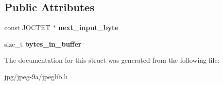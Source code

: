 \subsection*{Public Attributes}
\begin{DoxyCompactItemize}
\item 
\hypertarget{structjpeg__source__mgr_aad884e7f4ba7496ab0f56c942c7585c1}{const J\+O\+C\+T\+E\+T $\ast$ {\bfseries next\+\_\+input\+\_\+byte}}\label{structjpeg__source__mgr_aad884e7f4ba7496ab0f56c942c7585c1}

\item 
\hypertarget{structjpeg__source__mgr_a8ecb72557c1c9666d77fffea074282a4}{size\+\_\+t {\bfseries bytes\+\_\+in\+\_\+buffer}}\label{structjpeg__source__mgr_a8ecb72557c1c9666d77fffea074282a4}

\end{DoxyCompactItemize}


The documentation for this struct was generated from the following file\+:\begin{DoxyCompactItemize}
\item 
jpg/jpeg-\/9a/jpeglib.\+h\end{DoxyCompactItemize}
